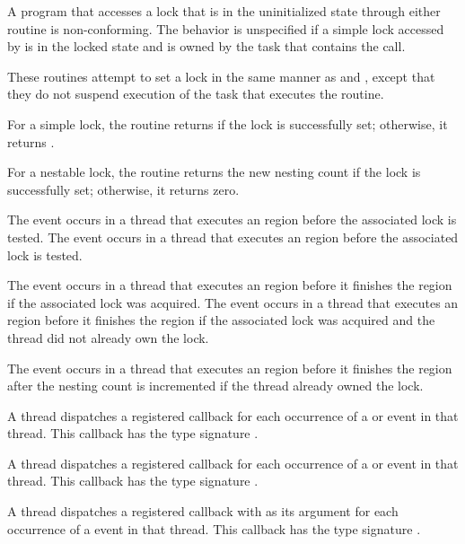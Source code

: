 \constraints
A program that accesses a lock that is in the uninitialized state 
through either routine is non-conforming. The behavior is unspecified 
if a simple lock accessed by  is in the locked state 
and is owned by the task that contains the call.

\effect
These routines attempt to set a lock in the same manner as  
and , except that they do not suspend execution of the 
task that executes the routine.

For a simple lock, the  routine returns  if 
the lock is successfully set; otherwise, it returns .

For a nestable lock, the  routine returns the 
new nesting count if the lock is successfully set; otherwise, it returns zero.

\events
The  event occurs in a thread that executes an 
 region before the associated lock is tested.
The  event occurs in a thread that executes 
an  region before the associated lock is tested.

The  event occurs in a thread that executes an 
 region before it finishes the region if the associated 
lock was acquired. The  event occurs in a 
thread that executes an  region before it finishes
the region if the associated lock was acquired and the thread did not already 
own the lock.

The  event occurs in a thread that executes an 
 region before it finishes the region after 
the nesting count is incremented if the thread already owned the lock.

\tools
A thread dispatches a registered 
callback for each occurrence of a  or  
event in that thread. This callback has the type signature 
.

A thread dispatches a registered 
callback for each occurrence of a  or 
 event in that thread.  This callback has 
the type signature .

A thread dispatches a registered 
callback with  as its  argument
for each occurrence of a  event in that thread. 
This callback has the type signature .

